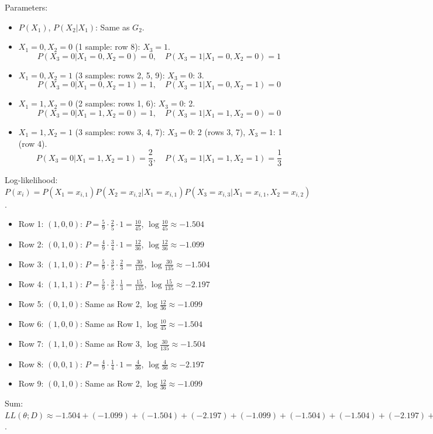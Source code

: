 \documentclass[a3paper,12pt]{extarticle} %
\begin{document}
Parameters:
\begin{itemize}
    \item \(P(X_1)\), \(P(X_2 | X_1)\): Same as \(G_2\).
    \item \(X_1 = 0, X_2 = 0\) (1 sample: row 8): \(X_3 = 1\).
    \[
    P(X_3 = 0 | X_1 = 0, X_2 = 0) = 0, \quad P(X_3 = 1 | X_1 = 0, X_2 = 0) = 1
    \]
    \item \(X_1 = 0, X_2 = 1\) (3 samples: rows 2, 5, 9): \(X_3 = 0\): 3.
    \[
    P(X_3 = 0 | X_1 = 0, X_2 = 1) = 1, \quad P(X_3 = 1 | X_1 = 0, X_2 = 1) = 0
    \]
    \item \(X_1 = 1, X_2 = 0\) (2 samples: rows 1, 6): \(X_3 = 0\): 2.
    \[
    P(X_3 = 0 | X_1 = 1, X_2 = 0) = 1, \quad P(X_3 = 1 | X_1 = 1, X_2 = 0) = 0
    \]
    \item \(X_1 = 1, X_2 = 1\) (3 samples: rows 3, 4, 7): \(X_3 = 0\): 2 (rows 3, 7), \(X_3 = 1\): 1 (row 4).
    \[
    P(X_3 = 0 | X_1 = 1, X_2 = 1) = \frac{2}{3}, \quad P(X_3 = 1 | X_1 = 1, X_2 = 1) = \frac{1}{3}
    \]
\end{itemize}

Log-likelihood: \(P(x_i) = P(X_1 = x_{i,1}) P(X_2 = x_{i,2} | X_1 = x_{i,1}) P(X_3 = x_{i,3} | X_1 = x_{i,1}, X_2 = x_{i,2})\).
\begin{itemize}
    \item Row 1: \((1,0,0)\): \(P = \frac{5}{9} \cdot \frac{2}{5} \cdot 1 = \frac{10}{45}\), \(\log \frac{10}{45} \approx -1.504\)
    \item Row 2: \((0,1,0)\): \(P = \frac{4}{9} \cdot \frac{3}{4} \cdot 1 = \frac{12}{36}\), \(\log \frac{12}{36} \approx -1.099\)
    \item Row 3: \((1,1,0)\): \(P = \frac{5}{9} \cdot \frac{3}{5} \cdot \frac{2}{3} = \frac{30}{135}\), \(\log \frac{30}{135} \approx -1.504\)
    \item Row 4: \((1,1,1)\): \(P = \frac{5}{9} \cdot \frac{3}{5} \cdot \frac{1}{3} = \frac{15}{135}\), \(\log \frac{15}{135} \approx -2.197\)
    \item Row 5: \((0,1,0)\): Same as Row 2, \(\log \frac{12}{36} \approx -1.099\)
    \item Row 6: \((1,0,0)\): Same as Row 1, \(\log \frac{10}{45} \approx -1.504\)
    \item Row 7: \((1,1,0)\): Same as Row 3, \(\log \frac{30}{135} \approx -1.504\)
    \item Row 8: \((0,0,1)\): \(P = \frac{4}{9} \cdot \frac{1}{4} \cdot 1 = \frac{4}{36}\), \(\log \frac{4}{36} \approx -2.197\)
    \item Row 9: \((0,1,0)\): Same as Row 2, \(\log \frac{12}{36} \approx -1.099\)
\end{itemize}
Sum: \(LL(\theta; D) \approx -1.504 + (-1.099) + (-1.504) + (-2.197) + (-1.099) + (-1.504) + (-1.504) + (-2.197) + (-1.099) \approx -13.707\).
\end{document}
